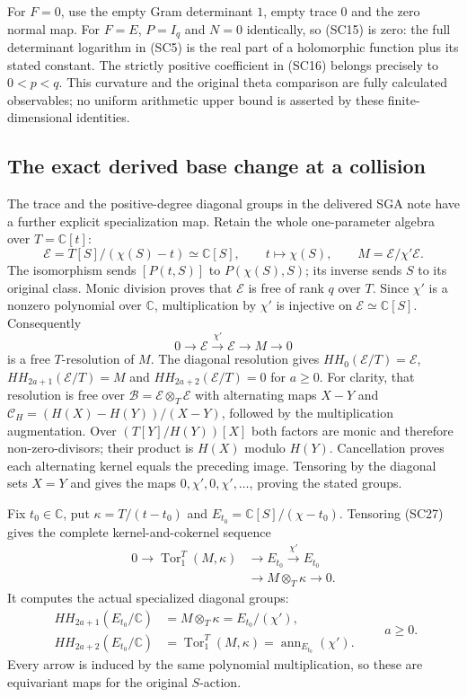 \documentclass{article}
\begin{document}
For $F=0$, use the empty Gram determinant $1$, empty trace $0$
and the zero normal map.  For $F=E$, $P=I_q$ and $N=0$ identically,
so (SC15) is zero: the full determinant logarithm in (SC5) is the
real part of a holomorphic function plus its stated constant.
The strictly positive coefficient in (SC16) belongs precisely to
$0<p<q$.  This curvature and the original theta comparison are
fully calculated observables; no uniform arithmetic upper bound is
asserted by these finite-dimensional identities.

\subsection{The exact derived base change at a collision}

The trace and the positive-degree diagonal groups in the delivered
SGA note have a further explicit specialization map.  Retain the
whole one-parameter algebra over $T=\mathbb C[t]$:
\[
 \mathscr E=T[S]/(\chi(S)-t)\simeq\mathbb C[S],
 \qquad t\longmapsto\chi(S),\qquad
 M=\mathscr E/\chi'\mathscr E.
 \tag{SC26}
\]
The isomorphism sends $[P(t,S)]$ to $P(\chi(S),S)$; its inverse
sends $S$ to its original class.  Monic division proves that
$\mathscr E$ is free of rank $q$ over $T$.  Since $\chi'$ is a
nonzero polynomial over $\mathbb C$, multiplication by $\chi'$
is injective on $\mathscr E\simeq\mathbb C[S]$.  Consequently
\[
 0\longrightarrow\mathscr E\xrightarrow{\chi'}\mathscr E
   \longrightarrow M\longrightarrow0
 \tag{SC27}
\]
is a free $T$-resolution of $M$.  The diagonal resolution gives
$HH_0(\mathscr E/T)=\mathscr E$,
$HH_{2a+1}(\mathscr E/T)=M$ and
$HH_{2a+2}(\mathscr E/T)=0$ for $a\geq0$.
For clarity, that resolution is free over
$\mathscr B=\mathscr E\otimes_T\mathscr E$ with alternating maps
$X-Y$ and $\mathcal C_H=(H(X)-H(Y))/(X-Y)$, followed by
the multiplication augmentation.  Over
$(T[Y]/H(Y))[X]$ both factors are monic and therefore
non-zero-divisors; their product is $H(X)$ modulo $H(Y)$.
Cancellation proves each alternating kernel equals the preceding
image.  Tensoring by the diagonal sets $X=Y$ and gives the maps
$0,\chi',0,\chi',\ldots$, proving the stated groups.

Fix $t_0\in\mathbb C$, put $\kappa=T/(t-t_0)$ and
$E_{t_0}=\mathbb C[S]/(\chi-t_0)$.  Tensoring (SC27) gives the
complete kernel-and-cokernel sequence
\[
\begin{split}
0\longrightarrow\operatorname{Tor}_1^T(M,\kappa)
 &\longrightarrow E_{t_0}\xrightarrow{\chi'} E_{t_0}\\
 &\longrightarrow M\otimes_T\kappa\longrightarrow0.
\end{split}\tag{SC28}
\]
It computes the actual specialized diagonal groups:
\[
 \begin{split}
 HH_{2a+1}(E_{t_0}/\mathbb C)&=M\otimes_T\kappa
                              =E_{t_0}/(\chi'),\\
 HH_{2a+2}(E_{t_0}/\mathbb C)&=\operatorname{Tor}_1^T(M,\kappa)
                              =\operatorname{ann}_{E_{t_0}}(\chi').
 \end{split}\qquad a\geq0.
 \tag{SC29}
\]
Every arrow is induced by the same polynomial multiplication,
so these are equivariant maps for the original $S$-action.
\end{document}
